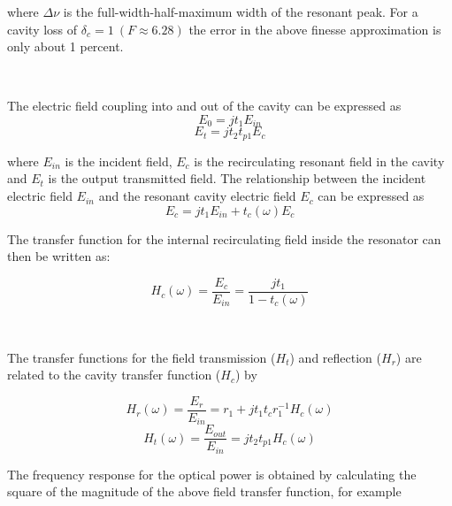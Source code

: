 \documentclass[10pt]{article}
\begin{document}
\noindent  where $\Delta\nu$ is the full-width-half-maximum width of the resonant peak.   For a cavity loss of  $ \delta_c = 1 ~ (F \approx 6.28) $ the error in the above finesse approximation is only about 1 percent.

~

The electric field coupling into and out of the cavity can be expressed as
\begin{equation} E_0 = j t_1 E_{in} \end{equation}
\begin{equation} E_{t} = j t_2 t_{p1} E_c \end{equation}

\noindent      where $E_{in}$ is the incident field, $E_{c}$ is the recirculating resonant field in the cavity and $E_t$ is the output transmitted field.    The relationship between the incident electric field $E_{in}$ and the resonant cavity electric field $E_c$ can be expressed as
\begin{equation} E_c = jt_1E_{in}+t_c(\omega)E_c  \end{equation}  

\noindent  The transfer function for the internal recirculating field inside the resonator can then be written as:

\begin{equation}
\boxed{ H_c(\omega) = \frac{E_{c}}{E_{in}} = \frac{jt_1}{1-t_c(\omega)}  }      
\label{eq:Hc}
\end{equation}
 
 
 
~
\newline


 The transfer functions for the field transmission ($H_t$) and reflection ($H_r$) are related to the cavity transfer function ($H_c$) by


\begin{equation} 
H_r(\omega) = \frac{E_{r}}{E_{in}} = r_1 + j t_1 t_c r_1^{-1} H_c(\omega) 
\label{eq:Hr}
\end{equation}
\begin{equation} 
H_t(\omega) = \frac{E_{out}}{E_{in}} = j t_2 t_{p1} H_c(\omega)
\label{eq:Ht} 
\end{equation}



\noindent The frequency response for the optical power is obtained by calculating the square of the magnitude of the above field transfer function, for example
\end{document}
